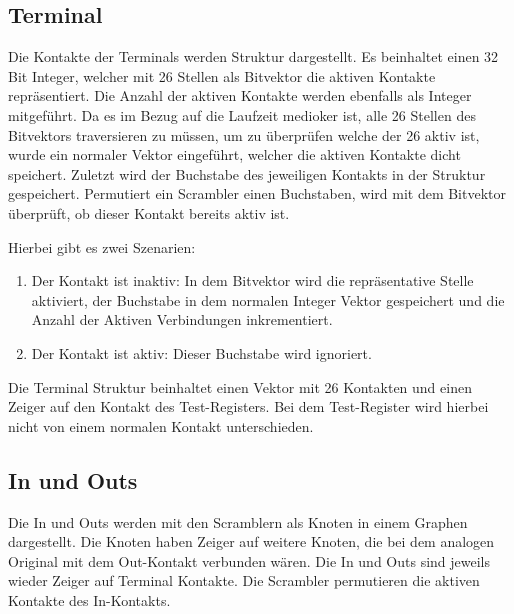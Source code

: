 \subsection{Terminal}\label{subsec:impl_terminal}
Die Kontakte der Terminals werden Struktur dargestellt.
Es beinhaltet einen 32 Bit Integer, welcher mit 26 Stellen als Bitvektor die aktiven Kontakte repräsentiert.
Die Anzahl der aktiven Kontakte werden ebenfalls als Integer mitgeführt.
Da es im Bezug auf die Laufzeit medioker ist, alle 26 Stellen des Bitvektors traversieren zu müssen, um zu überprüfen welche der 26 aktiv ist, wurde ein normaler Vektor eingeführt, welcher die aktiven Kontakte \glqq dicht\grqq{} speichert. 
Zuletzt wird der Buchstabe des jeweiligen Kontakts in der Struktur gespeichert.
Permutiert ein Scrambler einen Buchstaben, wird mit dem Bitvektor überprüft, ob dieser Kontakt bereits aktiv ist.

Hierbei gibt es zwei Szenarien:
\begin{enumerate}
	\item Der Kontakt ist inaktiv: In dem Bitvektor wird die repräsentative Stelle aktiviert, der Buchstabe in dem normalen Integer Vektor gespeichert und die Anzahl der Aktiven Verbindungen inkrementiert.
	
	\item Der Kontakt ist aktiv: Dieser Buchstabe wird ignoriert. 
\end{enumerate}

\noindent


Die Terminal Struktur beinhaltet einen Vektor mit 26 Kontakten und einen Zeiger auf den Kontakt des Test-Registers.
Bei dem Test-Register wird hierbei nicht von einem \glqq normalen\grqq{} Kontakt unterschieden.


\subsection{In und Outs}\label{subsec:impl_in_und_outs}
Die In und Outs werden mit den Scramblern als Knoten in einem Graphen dargestellt.
Die Knoten haben Zeiger auf weitere Knoten, die bei dem analogen Original mit dem Out-Kontakt verbunden wären.
Die In und Outs sind jeweils wieder Zeiger auf Terminal Kontakte.
Die Scrambler permutieren die aktiven Kontakte des In-Kontakts.

